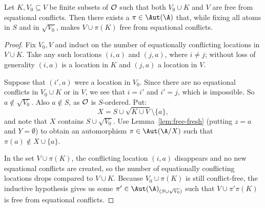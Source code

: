 \begin{lemma}\label{lem:?}
    Let $K, V_0 \subseteq V$ be finite subsets of $\cal O$ such that both $V_0\cup K$ and $V$ are free from equational conflicts. Then there exists a $\pi\in\Aut(\A)$ that, while fixing all atoms in $S$ and in $\sqrt{V_0}$, makes $V \cup \pi(K)$ free from equational conflicts.
\end{lemma}
\begin{proof}
    Fix $V_0, V$ and induct on the number of equationally conflicting locations in $V \cup K$. 
    Take any such locations $(i,a)$ and $(j,a)$, where $i \neq j$; without loss of generality $(i,a)$ is a location in $K$ and $(j,a)$ a location in $V$. 

    Suppose that $(i', a)$ were a location in $V_0$.
    Since there are no equational conflicts in $V_0\cup K$ or in $V$, we see that $i = i'$ and $i' = j$, which is impossible.
    So $a \not\in \sqrt{V_0}$.
    Also $a\not\in S$, as $\cal O$ is $S$-ordered.
    Put: 
    \[
        X = S \cup \sqrt{K \cup V} \setminus \{a\},
    \]
    and note that $X$ contains $S \cup \sqrt{V_0}$.
    Use Lemma~\ref{lem:free-fresh} (putting $z=a$ and $Y=\emptyset$) to obtain an automorphism $\pi \in \Aut(\A/X)$ such that $\pi(a) \not\in X \cup \{a\}$. 
    
    In the set $V\cup\pi(K)$, the conflicting location $(i,a)$ disappears and no new equational conflicts are created, so the number of equationally conflicting locations drops compared to $V\cup K$.
    Because $V_0 \cup \pi(K)$ is still conflict-free,
    the inductive hypothesis gives us some $\pi' \in \Aut(\A)_{(S \cup \sqrt{V_0})}$ such that $V \cup \pi' \pi(K)$ is free from equational conflicts.
\end{proof}

